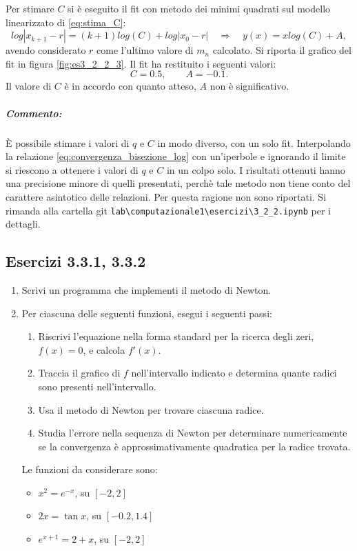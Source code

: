 \documentclass[letterpaper, 12pt]{article}
\numberwithin{equation}{section}    %
\begin{document}
Per stimare $C$ si è eseguito il fit con metodo dei minimi quadrati sul modello linearizzato di \ref{eq:stima_C}:
\begin{equation}
    log |x_{k+1}-r| = (k+1)log(C) + log|x_0 - r|  \quad \Rightarrow \quad  y(x) = x log(C) + A ,
\end{equation}
avendo considerato $r$ come l'ultimo valore di $m_n$ calcolato. Si riporta il grafico del fit in 
figura \ref{fig:es3_2_2_3}. Il fit ha restituito i seguenti valori:
\begin{equation*}
    C = 0.5,
    \qquad
    A = -0.1.
\end{equation*}
Il valore di $C$ è in accordo con quanto atteso, $A$ non è significativo.
\subparagraph{Commento:}È possibile stimare i valori di $q$ e $C$ in modo diverso, con un solo fit.
Interpolando la relazione \ref{eq:convergenza_bisezione_log} con un'iperbole e ignorando il limite 
si riescono a ottenere i valori di $q$ e $C$ in un colpo solo. I risultati ottenuti hanno una precisione minore 
di quelli presentati, perchè tale metodo non tiene conto
del carattere asintotico delle relazioni. Per questa ragione non sono riportati. Si rimanda alla cartella git
\verb|lab\computazionale1\esercizi\3_2_2.ipynb| per i dettagli.

\subsection{Esercizi 3.3.1, 3.3.2}

\begin{enumerate}
    \item Scrivi un programma che implementi il metodo di Newton.
    \item Per ciascuna delle seguenti funzioni, esegui i seguenti passi:
    \begin{enumerate}
        \item Riscrivi l'equazione nella forma standard per la ricerca degli zeri, $f(x) = 0$, e calcola $f'(x)$.
        \item Traccia il grafico di $f$ nell'intervallo indicato e determina quante radici sono presenti 
        nell'intervallo.
        \item Usa il metodo di Newton per trovare ciascuna radice.
        \item Studia l'errore nella sequenza di Newton per determinare numericamente se la convergenza è 
        approssimativamente quadratica per la radice trovata.
    \end{enumerate}
Le funzioni da considerare sono:
    \begin{itemize}
        \item $x^2 = e^{-x}$, su $[-2,2]$
        \item $2x = \tan x$, su $[-0.2,1.4]$
        \item $e^{x+1} = 2 + x$, su $[-2,2]$
    \end{itemize}
\end{enumerate}
    
\end{document}
